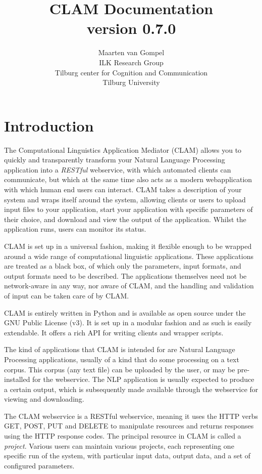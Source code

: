 \documentclass[a4paper,12pt]{report}
\title{CLAM Documentation \\ \small version 0.7.0}
\author{Maarten van Gompel \\ ILK Research Group \\ Tilburg center for Cognition and Communication \\ Tilburg University }
\begin{document}
\sffamily

\maketitle
\tableofcontents

\chapter{Introduction} 

The Computational Linguistics Application Mediator (CLAM) allows you to quickly and transparently transform your Natural Language Processing application into a \emph{RESTful}\/ webservice, with which automated clients can communicate, but which at the same time also acts as a modern webapplication with which human end users can interact. CLAM takes a description of your system and wraps itself around the system, allowing clients or users to upload input files to your application, start your application with specific parameters of their choice, and download and view the output of the application. Whilst the application runs, users can monitor its status.

CLAM is set up in a universal fashion, making it flexible enough to be wrapped around a wide range of computational linguistic applications. These applications are treated as a black box, of which only the parameters, input formats, and output formats need to be described. The applications themselves need not be network-aware in any way, nor aware of CLAM, and the handling and validation of input can be taken care of by CLAM.

CLAM is entirely written in Python and is available as open source under the GNU Public License (v3). It is set up in a modular fashion and as such is easily extendable. It offers a rich API for writing clients and wrapper scripts.

The kind of applications that CLAM is intended for are Natural Language Processing applications, usually of a kind that do some processing on a text corpus. This corpus (any text file) can be uploaded by the user, or may be pre-installed for the webservice. The NLP application is usually expected to produce a certain output, which is subsequently made available through the webservice for viewing and downloading.

The CLAM webservice is a RESTful webservice, meaning it uses the HTTP verbs GET, POST, PUT and DELETE to manipulate resources and returns responses using the HTTP response codes. The principal resource in CLAM is called a \emph{project}. Various users can maintain various projects, each representing one specific run of the system, with particular input data, output data, and a set of configured parameters.
\end{document}
